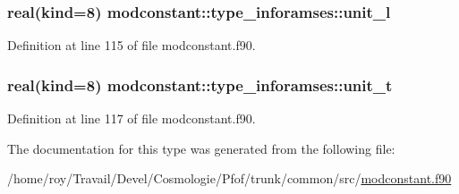\subsubsection[{\texorpdfstring{unit\+\_\+l}{unit_l}}]{\setlength{\rightskip}{0pt plus 5cm}real(kind=8) modconstant\+::type\+\_\+inforamses\+::unit\+\_\+l}\hypertarget{structmodconstant_1_1type__inforamses_a6f87e3e1bebd53aa16cbc67b1a47ad80}{}\label{structmodconstant_1_1type__inforamses_a6f87e3e1bebd53aa16cbc67b1a47ad80}


Definition at line 115 of file modconstant.\+f90.

\subsubsection[{\texorpdfstring{unit\+\_\+t}{unit_t}}]{\setlength{\rightskip}{0pt plus 5cm}real(kind=8) modconstant\+::type\+\_\+inforamses\+::unit\+\_\+t}\hypertarget{structmodconstant_1_1type__inforamses_a476201b699ccd42e319364d8975a9293}{}\label{structmodconstant_1_1type__inforamses_a476201b699ccd42e319364d8975a9293}


Definition at line 117 of file modconstant.\+f90.



The documentation for this type was generated from the following file\+:\begin{DoxyCompactItemize}
\item 
/home/roy/\+Travail/\+Devel/\+Cosmologie/\+Pfof/trunk/common/src/\hyperlink{modconstant_8f90}{modconstant.\+f90}\end{DoxyCompactItemize}
